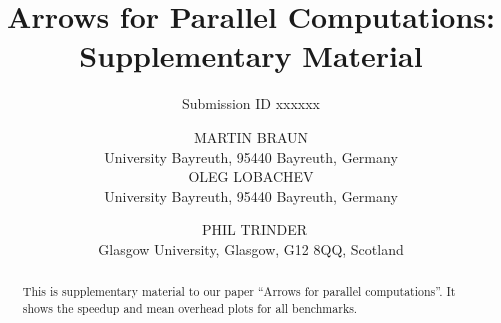 \documentclass[final]{jfp1}
\title{Arrows for Parallel Computations: Supplementary Material}
\author{Submission ID xxxxxx}
\author[M. Braun, O. Lobachev and P. Trinder]%
        {MARTIN BRAUN\\
         University Bayreuth, 95440 Bayreuth, Germany\\
		 OLEG LOBACHEV\\
		 University Bayreuth, 95440 Bayreuth, Germany\\
		 \and\ PHIL TRINDER\\
		 Glasgow University, Glasgow, G12 8QQ, Scotland}
\begin{document}
\label{firstpage}

\def\SymbReg{\textsuperscript{\textregistered}}

\maketitle

\begin{abstract}
  This is supplementary material to our paper \enquote{Arrows for
    parallel computations}. It shows the speedup and mean overhead
  plots for all benchmarks.
\end{abstract}

\tableofcontents
%

\newlength{\plotwidthDist}
\setlength{\plotwidthDist}{0.6\textwidth}
\newlength{\plotwidthSMP}
\setlength{\plotwidthSMP}{\plotwidthDist}

\newcommand{\meanOverheadPlot}[5]{
\begin{tikzpicture}
\begin{axis}[title={#1},
title style={align=center},
scale only axis, width=\plotwidthDist,
xlabel=Threads,
ytick distance=#2 / 4,
xtick distance=#3,
minor tick num=9,
ylabel=Overhead,
ylabel near ticks,
grid=both,
legend entries={Mean Overhead},
legend style={at={(0.99,0.99)},anchor=north east},
max space between ticks=50pt,
grid style={line width=.1pt, draw=gray!10},
major grid style={line width=.2pt,draw=gray!50},
ymin=-#2,
ymax=#2,
xmin=-1,
xmax=#4]
\addplot+[mark=*,very thick,error bars/.cd,
    y dir=both,y explicit] table [x="nCores", y="overhead", y error="stdDevForOverhead", col sep=comma, mark=dots,
smooth]{#5};
\end{axis}
\end{tikzpicture}
}

\newcommand{\speedupplot}[8]{
\begin{tikzpicture}
\begin{axis}[title={#1},
title style={align=center},
scale only axis, width=#7,
xlabel=Threads,
xtick distance=#4,
ytick distance=#4,
ylabel=Speedup,
ylabel near ticks,
grid=major,
legend entries={linear, #2},
legend style={at={(0.01,0.99)},anchor=north west},
max space between ticks=50pt,
grid style={line width=.1pt, draw=gray!10},
major grid style={line width=.2pt,draw=gray!50},
ymin=-1,
xmin=-1,
ymax=#8,
xmax=#6]
\addplot [domain=0:#3, no markers,dotted,thick]{x};
#5
\end{axis}
\end{tikzpicture}
}
\end{document}
